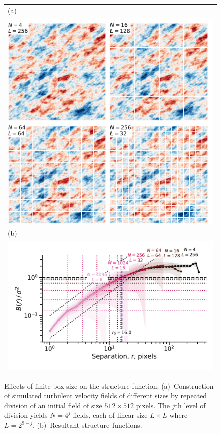 \documentclass[fleqn,usenatbib, useAMS, a4paper]{mnras}
\begin{document}
\begin{figure}
  \begin{tabular}{@{} l @{}}
    (a)\\
    \includegraphics[width=\linewidth]{Figures/fake-finite-box-images}
    \\[\bigskipamount]
    (b)\\
    \includegraphics[width=\linewidth]{Figures/fake-finite-box-strucfunc2}
  \end{tabular}
  \caption{Effects of finite box size on the structure function.
    (a)~Construction of simulated turbulent velocity fields of different sizes
    by repeated division of an initial field of size \(512 \times 512\) pixels.
    The \(j\)th level of division yields \(N = 4^j\) fields,
    each of linear size \(L \times L\) where \(L = 2^{9 - j}\). 
    (b)~Resultant structure functions.
  }
  \label{fig:finite-box}
\end{figure}
\end{document}
